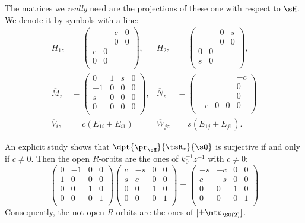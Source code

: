 The matrices we \emph{really} need are the projections of these one with respect to $\sH$. We denote it by  symbols with a line:
\begin{subequations}
\begin{align}
\overline{H}_{1z}&=
\begin{pmatrix}
 &   &c  &0\\
 &   &0 &0\\
c & 0  &  &\\
0 & 0  &  &\\
\end{pmatrix},
&\overline{H}_{2z}&=
\begin{pmatrix}
 &   & 0 &s\\
 &   & 0 &0\\
0 & 0  &  &\\
s & 0  &  &\\
\end{pmatrix},\\
\overline{M}_z&=
\begin{pmatrix}
0  & 1 & s &0\\
-1 & 0 & 0 &0\\
s  & 0 & 0 &0\\
0  & 0 & 0 &0\\
\end{pmatrix},
&\overline{N}_z&=
\begin{pmatrix}
  &  &  &-c\\
  &  &  &0\\
  &  &  &0\\
-c & 0 & 0 &0\\
\end{pmatrix}\\
  \overline{V}_{iz}&=c(E_{1i}+E_{i1})
 &\overline{W}_{jz}&=s(E_{1j}+E_{j1}).
\end{align}
\end{subequations}

An explicit study shows that $\dpt{\pr_{\sH}}{\tsR_z}{\sQ}$ is surjective if and only if $c\neq 0$. Then the open $R$-orbits are the ones of $k_0^{-1} z^{-1}$ with $c\neq 0$:
\begin{equation}
\begin{pmatrix}
  0 & -1 & 0 & 0\\
  1 & 0  & 0 & 0\\
  0 & 0  & 1 & 0\\
  0 & 0  & 0 & 1\\
\end{pmatrix}
\begin{pmatrix}
  c & -s & 0 & 0\\
  s & c  & 0 & 0\\
  0 & 0  & 1 & 0\\
  0 & 0  & 0 & 1\\
\end{pmatrix}
=
\begin{pmatrix}
  -s & -c & 0 & 0\\
  c  & -s & 0 & 0\\
  0  &  0 & 1 & 0\\
  0  & 0  & 0 & 1\\
\end{pmatrix}
\end{equation}
Consequently, the not open $R$-orbits are the ones of $[\pm\mtu_{\SO(2)}]$.

